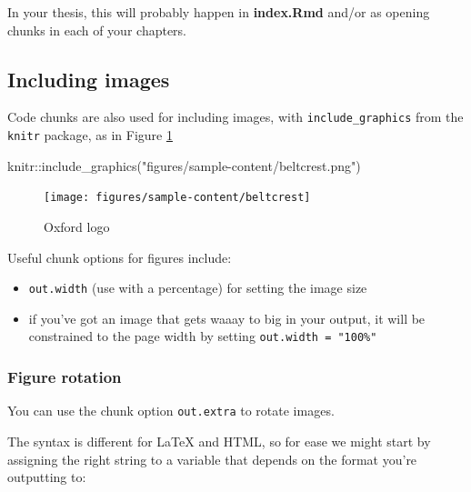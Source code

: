 \documentclass[a4paper, nobind]{templates/ociamthesis}
\providecommand{\tightlist}{%
  \setlength{\itemsep}{0pt}\setlength{\parskip}{0pt}}
\newenvironment{Shaded}{\begin{snugshade}}{\end{snugshade}}
\newcommand{\FunctionTok}[1]{\textcolor[rgb]{0.00,0.00,0.00}{#1}}
\newcommand{\NormalTok}[1]{#1}
\newcommand{\SpecialCharTok}[1]{\textcolor[rgb]{0.00,0.00,0.00}{#1}}
\newcommand{\StringTok}[1]{\textcolor[rgb]{0.31,0.60,0.02}{#1}}
\renewenvironment{Shaded}
{
  \vspace{10pt}%
  \begin{snugshade}%
}{%
  \end{snugshade}%
  \vspace{8pt}%
}
\begin{document}
In your thesis, this will probably happen in \textbf{index.Rmd} and/or as opening chunks in each of your chapters.

\hypertarget{including-images}{%
\subsection{Including images}\label{including-images}}

Code chunks are also used for including images, with \texttt{include\_graphics} from the \texttt{knitr} package, as in Figure \ref{fig:oxford-logo}

\begin{Shaded}
\begin{Highlighting}[]
\NormalTok{knitr}\SpecialCharTok{::}\FunctionTok{include\_graphics}\NormalTok{(}\StringTok{"figures/sample{-}content/beltcrest.png"}\NormalTok{)}
\end{Highlighting}
\end{Shaded}

\begin{figure}

{\centering \texttt{[image: figures/sample-content/beltcrest]} 

}

\caption{Oxford logo}\label{fig:oxford-logo}
\end{figure}

Useful chunk options for figures include:

\begin{itemize}
\tightlist
\item
  \texttt{out.width} (use with a percentage) for setting the image size
\item
  if you've got an image that gets waaay to big in your output, it will be constrained to the page width by setting \texttt{out.width\ =\ "100\%"}
\end{itemize}

\hypertarget{figure-rotation}{%
\subsubsection*{Figure rotation}\label{figure-rotation}}

You can use the chunk option \texttt{out.extra} to rotate images.

The syntax is different for LaTeX and HTML, so for ease we might start by assigning the right string to a variable that depends on the format you're outputting to:
\end{document}
